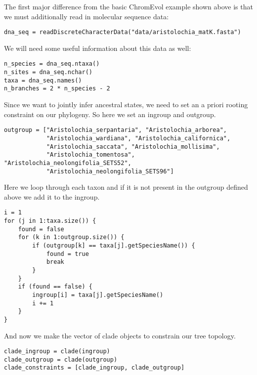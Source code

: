 The first major difference from the basic ChromEvol example shown above is that we must additionally
read in molecular sequence data:
{\tt \begin{snugshade*}
\begin{lstlisting}
dna_seq = readDiscreteCharacterData("data/aristolochia_matK.fasta")
\end{lstlisting}
\end{snugshade*}}
We will need some useful information about this data as well:
{\tt \begin{snugshade*}
\begin{lstlisting}
n_species = dna_seq.ntaxa()
n_sites = dna_seq.nchar()
taxa = dna_seq.names()
n_branches = 2 * n_species - 2
\end{lstlisting}
\end{snugshade*}}
Since we want to jointly infer ancestral states, we need to set an a priori
rooting constraint on our phylogeny. So here we set an ingroup and outgroup.
{\tt \begin{snugshade*}
\begin{lstlisting}
outgroup = ["Aristolochia_serpantaria", "Aristolochia_arborea", 
            "Aristolochia_wardiana", "Aristolochia_californica", 
            "Aristolochia_saccata", "Aristolochia_mollisima",
            "Aristolochia_tomentosa", "Aristolochia_neolongifolia_SETS52", 
            "Aristolochia_neolongifolia_SETS96"]
\end{lstlisting}
\end{snugshade*}}
Here we loop through each taxon and if it is not present in the outgroup
defined above we add it to the ingroup.
{\tt \begin{snugshade*}
\begin{lstlisting}
i = 1
for (j in 1:taxa.size()) {
    found = false
    for (k in 1:outgroup.size()) {
        if (outgroup[k] == taxa[j].getSpeciesName()) {
            found = true
            break
        }
    }
    if (found == false) {
        ingroup[i] = taxa[j].getSpeciesName()
        i += 1
    }
}
\end{lstlisting}
\end{snugshade*}}
And now we make the vector of clade objects to constrain our tree topology.
{\tt \begin{snugshade*}
\begin{lstlisting}
clade_ingroup = clade(ingroup)
clade_outgroup = clade(outgroup)
clade_constraints = [clade_ingroup, clade_outgroup]
\end{lstlisting}
\end{snugshade*}}

